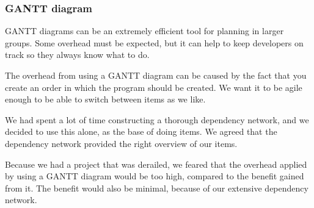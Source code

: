\subsubsection{GANTT diagram}
GANTT diagrams can be an extremely efficient tool for planning in larger groups. Some overhead must be expected, but it can help to keep developers on track so they always know what to do.

The overhead from using a GANTT diagram can be caused by the fact that you create an order in which the program should be created. We want it to be agile enough to be able to switch between items as we like.

We had spent a lot of time constructing a thorough dependency network, and we decided to use this alone, as the base of doing items. We agreed that the dependency network provided the right overview of our items.

Because we had a project that was derailed, we feared that the overhead applied by using a GANTT diagram would be too high, compared to the benefit gained from it. The benefit would also be minimal, because of our extensive dependency network.